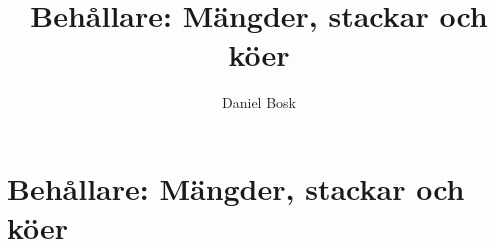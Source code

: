 \documentclass[a4paper,10pt,oneside,openright,
               oldfontcommands]{memoir}
\begin{document}
\title{%
  Behållare: Mängder, stackar och köer
}
\author{Daniel Bosk}

\maketitle

\begin{abstract}
  
\end{abstract}

\clearpage

\tableofcontents*

\chapter{Behållare: Mängder, stackar och köer}



\appendix


\printbibliography
\end{document}
